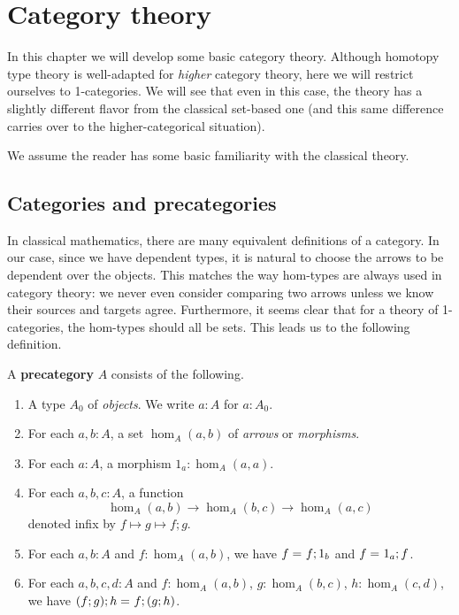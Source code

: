 \newcommand{\uset}{\ensuremath{\underline{\set}}\xspace}
\newcommand{\inv}[1]{{#1}^{-1}}
\newcommand{\idtoiso}{\ensuremath{\mathsf{idtoiso}}\xspace}
\newcommand{\isotoid}{\ensuremath{\mathsf{isotoid}}\xspace}

\chapter{Category theory}
\label{sec:category-theory}

In this chapter we will develop some basic category theory.  Although homotopy type theory is well-adapted for \emph{higher} category theory, here we will restrict ourselves to 1-categories.  We will see that even in this case, the theory has a slightly different flavor from the classical set-based one (and this same difference carries over to the higher-categorical situation).

We assume the reader has some basic familiarity with the classical theory.


\section{Categories and precategories}
\label{sec:cats}

In classical mathematics, there are many equivalent definitions of a category.  In our case, since we have dependent types, it is natural to choose the arrows to be dependent over the objects.  This matches the way hom-types are always used in category theory: we never even consider comparing two arrows unless we know their sources and targets agree.  Furthermore, it seems clear that for a theory of 1-categories, the hom-types should all be sets.  This leads us to the following definition.

\begin{defn}\label{ct:precategory}
  A \textbf{precategory} $A$ consists of the following.
  \begin{enumerate}
  \item A type $A_0$ of \emph{objects}.  We write $a:A$ for $a:A_0$.
  \item For each $a,b:A$, a set $\hom_A(a,b)$ of \emph{arrows} or \emph{morphisms}.
  \item For each $a:A$, a morphism $1_a:\hom_A(a,a)$.
  \item For each $a,b,c:A$, a function
    \[  \hom_A(a,b) \to \hom_A(b,c) \to \hom_A(a,c) \]
    denoted infix by $f\mapsto g\mapsto f;g$.
  \item For each $a,b:A$ and $f:\hom_A(a,b)$, we have $f =_{} f;1_b$ and $f =_{} 1_a;f$.
  \item For each $a,b,c,d:A$ and $f:\hom_A(a,b)$, $g:\hom_A(b,c)$, $h:\hom_A(c,d)$, we have $(f;g);h =_{} f;(g;h)$.
  \end{enumerate}
\end{defn}

